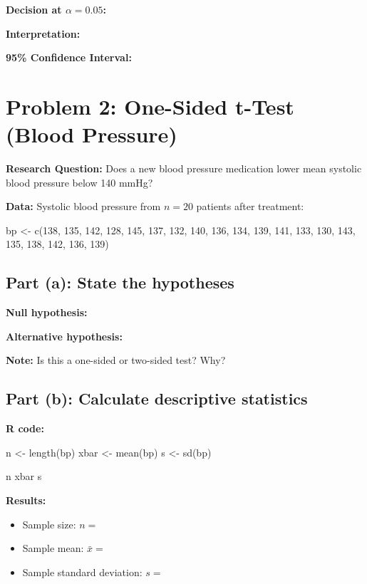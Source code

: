 \documentclass[11pt]{article}
\begin{document}
\textbf{Decision at $\alpha = 0.05$:}

\vspace{1cm}

\textbf{Interpretation:}

\vspace{3cm}

\textbf{95\% Confidence Interval:}

\vspace{1cm}

\pagebreak

\section*{Problem 2: One-Sided t-Test (Blood Pressure)}

\textbf{Research Question:} Does a new blood pressure medication lower mean systolic blood pressure below 140 mmHg?

\textbf{Data:} Systolic blood pressure from $n = 20$ patients after treatment:
\begin{rcode}
bp <- c(138, 135, 142, 128, 145, 137, 132, 140, 136, 134,
        139, 141, 133, 130, 143, 135, 138, 142, 136, 139)
\end{rcode}

\subsection*{Part (a): State the hypotheses}

\textbf{Null hypothesis:}

\vspace{1cm}

\textbf{Alternative hypothesis:}

\vspace{1cm}

\textbf{Note:} Is this a one-sided or two-sided test? Why?

\vspace{1cm}

\subsection*{Part (b): Calculate descriptive statistics}

\textbf{R code:}
\begin{rcode}
n <- length(bp)
xbar <- mean(bp)
s <- sd(bp)

n
xbar
s
\end{rcode}

\textbf{Results:}
\begin{itemize}
\item Sample size: $n = $
\item Sample mean: $\bar{x} = $
\item Sample standard deviation: $s = $
\end{itemize}
\end{document}
